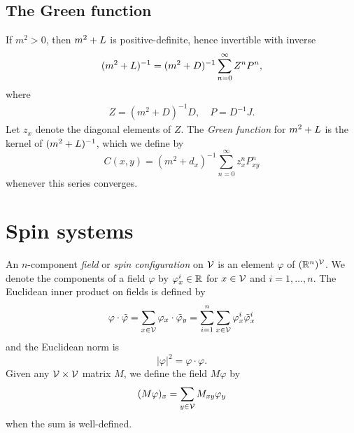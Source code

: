 
\subsection{The Green function}

If $m^2 > 0$, then $m^2 + L$ is positive-definite, hence invertible with inverse
\begin{equation}
(m^2 + L)^{-1} = (m^2 + D)^{-1} \sum_{n=0}^\infty Z^n P^n,
\end{equation}
where
\begin{align}
Z = (m^2 + D)^{-1} D,
  \quad
P = D^{-1} J.
\end{align}
Let $z_x$ denote the diagonal elements of $Z$.
The \emph{Green function} for $m^2 + L$ is the kernel of $(m^2 + L)^{-1}$, which we define by
\begin{equation}
C(x, y)
  =
(m^2 + d_x)^{-1} \sum_{n=0}^\infty z_x^n P^n_{xy}
\end{equation}
whenever this series converges.




\section{Spin systems}

An $n$-component \emph{field} or \emph{spin configuration} on $\mathcal{V}$
is an element $\varphi$ of $({\mathbb R}^n)^{\mathcal{V}}$.
We denote the components of a field $\varphi$
by $\varphi^i_x \in {\mathbb R}$ for $x \in \mathcal{V}$ and $i = 1, \ldots, n$.
The Euclidean inner product on fields is defined by
\begin{equation}
\varphi\cdot\tilde\varphi
  =
\sum_{x\in\mathcal{V}} \varphi_x \cdot \tilde\varphi_y
  =
\sum_{i=1}^n \sum_{x\in\mathcal{V}} \varphi^i_x \tilde\varphi^i_x
\end{equation}
and the Euclidean norm is
\begin{equation}
|\varphi|^2 = \varphi \cdot \varphi.
\end{equation}
Given any $\mathcal{V}\times\mathcal{V}$ matrix $M$, we define the field $M \varphi$ by
\begin{equation}
(M \varphi)_x = \sum_{y\in\mathcal{V}} M_{xy} \varphi_y
\end{equation}
when the sum is well-defined.

